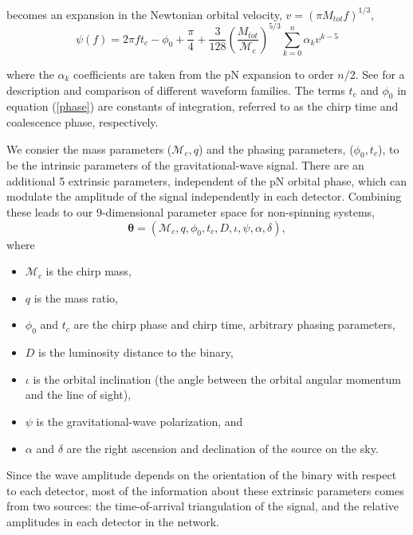 \documentclass[11pt,a4paper]{emulateapj} 
\newcommand{\thpara}{\boldsymbol{\theta}}
\newcommand{\chmass}{\mathcal{M}_c}
\begin{document}
becomes an expansion in the Newtonian orbital velocity, $v=(\pi
M_{tot} f)^{1/3}$,
\begin{equation}
\psi(f) = 2 \pi f t_c - \phi_0 + \frac{\pi}{4} +
\frac{3}{128}\left(\frac{M_{tot}}{\chmass}\right)^{5/3}\sum^{n}_{k=0}\alpha_{k}v^{k-5}
\label{phase}
\end{equation}

\noindent where the $\alpha_{k}$ coefficients are taken from the pN
expansion to order $n/2$.  See \cite{BuonannoWaveform} for a
description and comparison of different waveform families.  The terms
$t_c$ and $\phi_0$ in equation (\ref{phase}) are constants of
integration, referred to as the chirp time and coalescence phase,
respectively.

We consier the mass parameters ($\chmass,q$) and the phasing
parameters, ($\phi_0,t_c$), to be the intrinsic parameters of the
gravitational-wave signal.  There are an additional 5 extrinsic
parameters, independent of the pN orbital phase, which can modulate
the amplitude of the signal independently in each
detector.  Combining these leads to our 9-dimensional parameter space
for non-spinning systems,
\begin{equation}
\thpara = (\chmass, q, \phi_0,t_c,D,\iota,\psi,\alpha,\delta),
\label{parameterspace}
\end{equation}
where

\begin{itemize}
\item $\chmass$ is the chirp mass,
\item $q$ is the mass ratio,
\item $\phi_0$ and $t_c$ are the chirp phase and chirp time, arbitrary
  phasing parameters,
\item $D$ is the luminosity distance to the binary,
\item $\iota$ is the orbital inclination (the angle between the
  orbital angular momentum and the line of sight),
\item $\psi$ is the gravitational-wave polarization, and
\item $\alpha$ and $\delta$ are the right ascension and declination of
  the source on the sky.
\end{itemize}
  Since the wave amplitude depends on the orientation of the binary
  with respect to each detector, most of the information about these
  extrinsic parameters comes from two sources: the time-of-arrival
  triangulation of the signal, and the relative amplitudes
  in each detector in the network.
  
\end{document}
